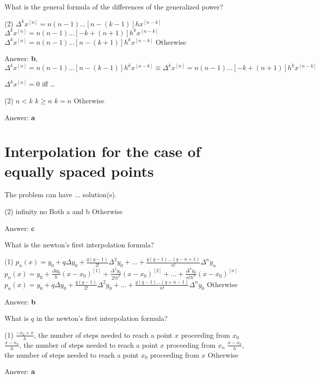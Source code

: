 \documentclass{exam}
\begin{document}
\begin{questions}
	\question What is the general formula of the differences of the generalized power?
	\begin{tasks}(2)
		\task $\Delta^k x^{[n]} = n(n-1)...[n-(k-1)] h x^{[n-k]}$
		\task $\Delta^k x^{[n]} = n(n-1)...[-k+(n+1)] h^k x^{[n-k]}$
		\task $\Delta^k x^{[n]} = n(n-1)...[n-(k+1)] h^k x^{[n-k]}$
		\task Otherwise
	\end{tasks}
	Answer: \textbf{b}, $\Delta^k x^{[n]} = n(n-1)...[n-(k-1)] h^k x^{[n-k]} \equiv \Delta^k x^{[n]} = n(n-1)...[-k+(n+1)] h^k x^{[n-k]}$

	\question $\Delta^k x^{[n]} = 0$ iff \dots
	\begin{tasks}(2)
		\task $n < k$
		\task $k \ge n$
		\task $k = n$
		\task Otherwise
	\end{tasks}
	Answer: \textbf{a}

	\section{Interpolation for the case of equally spaced points}

	\question The problem can have $\dots$ solution(s).
	\begin{tasks}(2)
		\task infinity
		\task no
		\task Both a and b
		\task Otherwise
	\end{tasks}
	Answer: \textbf{c}

	\question What is the newton's first interpolation formula?
	\begin{tasks}(1)
		\task $p_n(x) = y_0 + q \Delta y_0 + \frac{q(q-1)}{2!} \Delta^2 y_0 + \dots + \frac{q(q-1)\dots(q-n+1)}{n!} \Delta^n y_n$
		\task $p_n(x) = y_0 + \frac{\Delta y_0}{h}(x-x_0)^{[1]} + \frac{\Delta^2 y_0}{2!h^2}(x-x_0)^{[2]} + \dots + \frac{\Delta^n y_0}{n!h^n}(x-x_0)^{[n]}$
		\task $p_n(x) = y_0 + q \Delta y_0 + \frac{q(q-1)}{2!} \Delta^2 y_0 + \dots + \frac{q(q-1)\dots(q+n-1)}{n!} \Delta^n y_0$
		\task Otherwise
	\end{tasks}
	Answer: \textbf{b}

	\question What is $q$ in the newton's first interpolation formula?
	\begin{tasks}(1)
		\task $\frac{-x_0+x}{h}$, the number of steps needed to reach a point $x$ proceeding from $x_0$
		\task $\frac{x-x_n}{h}$, the number of steps needed to reach a point $x$ proceeding from $x_n$
		\task $\frac{x-x_0}{h}$, the number of steps needed to reach a point $x_0$ proceeding from $x$
		\task Otherwise
	\end{tasks}
	Answer: \textbf{a}


\end{questions}
\end{document}
